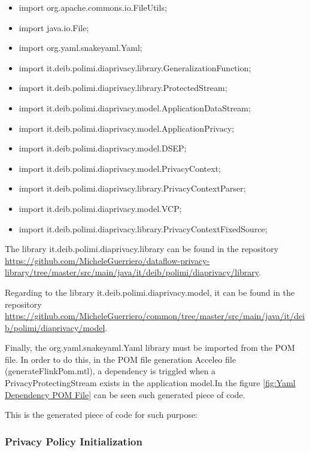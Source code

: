 \begin{itemize}
\item import org.apache.commons.io.FileUtils;
\item import java.io.File;
\item import org.yaml.snakeyaml.Yaml;
\item import it.deib.polimi.diaprivacy.library.GeneralizationFunction;
\item import it.deib.polimi.diaprivacy.library.ProtectedStream;
\item import it.deib.polimi.diaprivacy.model.ApplicationDataStream;
\item import it.deib.polimi.diaprivacy.model.ApplicationPrivacy;
\item import it.deib.polimi.diaprivacy.model.DSEP;
\item import it.deib.polimi.diaprivacy.model.PrivacyContext;
\item import it.deib.polimi.diaprivacy.library.PrivacyContextParser;
\item import it.deib.polimi.diaprivacy.model.VCP;
\item import it.deib.polimi.diaprivacy.library.PrivacyContextFixedSource;
\end{itemize}

The library it.deib.polimi.diaprivacy.library can be found in the repository \url{https://github.com/MicheleGuerriero/dataflow-privacy-library/tree/master/src/main/java/it/deib/polimi/diaprivacy/library}.

Regarding to the library it.deib.polimi.diaprivacy.model, it can be found in the repository \url{https://github.com/MicheleGuerriero/common/tree/master/src/main/java/it/deib/polimi/diaprivacy/model}.

Finally, the org.yaml.snakeyaml.Yaml library must be imported from the POM file. In order to do this, in the POM file generation Acceleo file (generateFlinkPom.mtl), a dependency is triggled when a PrivacyProtectingStream exists in the application model.In the figure \ref{fig:Yaml Dependency POM File} can be seen such generated piece of code.

This is the generated piece of code for such purpose:



\subsubsection{Privacy Policy Initialization}

